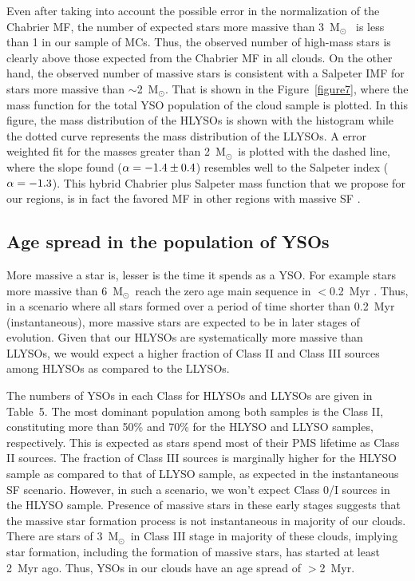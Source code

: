 \documentclass[iop]{emulateapj}
\newcommand{\msun}{M$_{\odot}$}
\begin{document}
Even after taking into account the possible error in the normalization of
the Chabrier MF, the number of expected stars more massive than 3~\msun~
is less than 1 in our sample of MCs. Thus, the observed number of high-mass 
stars is clearly above those expected from the Chabrier MF in all clouds.
On the other hand, the observed number of massive stars is consistent with
a Salpeter IMF for stars more massive than $\sim$2~\msun. 
That is shown in the Figure~\ref{figure7}, where the mass function for 
the total YSO population of the cloud sample is plotted. In this figure, the mass 
distribution of the HLYSOs is shown with the histogram while the dotted curve 
represents the mass distribution of the LLYSOs. A error weighted fit for the 
masses greater than 2~\msun\ is plotted with the dashed line, where the slope 
found ($\rm \alpha=-1.4\pm0.4$) resembles well to the Salpeter index ($\rm \alpha=-1.3$). 
This hybrid Chabrier plus Salpeter mass function that we propose for our regions, 
is in fact the favored MF in other regions with massive SF 
\citep[see the review by][]{bastian+10}.

\subsection{Age spread in the population of YSOs}

More massive a star is, lesser is the time it spends as a YSO. For example
stars more massive than 6~\msun\ reach the zero age main sequence in $<$0.2~Myr
 \citep{tognelli+11}. Thus, in a scenario where all stars formed over a period 
of time shorter than 0.2~Myr (instantaneous), more massive stars are expected to be in later 
stages of evolution. Given that our HLYSOs are systematically more massive 
than LLYSOs, we would expect a higher fraction of Class II and Class III sources
among HLYSOs as compared to the LLYSOs.

The numbers of YSOs in each Class for HLYSOs and LLYSOs are given in Table~5.
The most dominant population among both samples is the Class II, constituting
more than 50\% and 70\% for the HLYSO and LLYSO samples, respectively. 
This is expected as stars spend most of their PMS lifetime as Class II sources.
The fraction of Class III sources is marginally higher for the HLYSO sample 
as compared to that of LLYSO sample, as expected in the instantaneous SF scenario.
However, in such a scenario, we won't expect Class 0/I sources in the HLYSO sample.
Presence of massive stars in these early stages suggests that the massive star formation
process is not instantaneous in majority of our clouds.
There are stars of 3~\msun\  in Class III stage in majority of these clouds, 
implying star formation, including the formation of massive stars, has started 
at least 2~Myr ago. Thus, YSOs in our clouds have an age spread of $>$2~Myr. 
\end{document}
